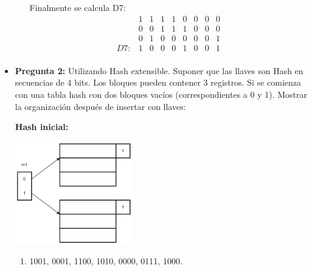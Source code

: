 \documentclass{templateNote}
\begin{document}
\begin{itemize}
\begin{itemize}
{            Finalmente se calcula D7:
            \begin{equation*}
                \begin{array}{ccccccccc}
                    & 1 & 1 & 1 & 1 & 0 & 0 & 0 & 0 \\
                    & 0 & 0 & 1 & 1 & 1 & 0 & 0 & 0 \\
                    & 0 & 1 & 0 & 0 & 0 & 0 & 0 & 1 \\ \hline
                D7: & 1 & 0 & 0 & 0 & 1 & 0 & 0 & 1 \\
                \end{array}
            \end{equation*}
        }
    \end{itemize}

    \item \textbf{Pregunta 2:} Utilizando Hash extensible. Suponer que las llaves son Hash en secuencias de 4 bits. Los bloques pueden contener 3 registros. Si se comienza con una tabla hash con dos bloques vacíos (correspondientes a 0 y 1). Mostrar la organización después de insertar con llaves:
    
    \textbf{Hash inicial:}
    \begin{center}
        \includegraphics[width=0.4\textwidth]{diagram/Problema2.png}
    \end{center}
    \begin{enumerate}
        \item 1001, 0001, 1100, 1010, 0000, 0111, 1000.
        

\end{enumerate}
\end{itemize}
\end{document}
